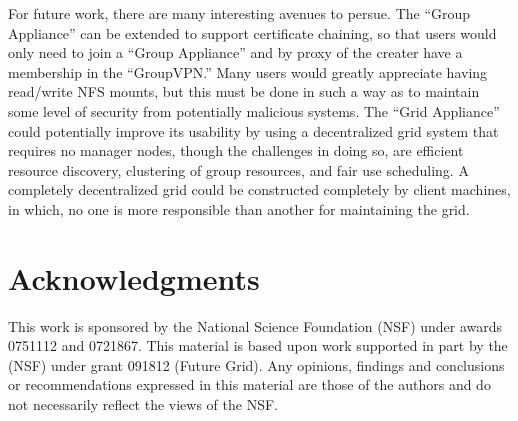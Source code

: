 \documentclass[conference]{IEEEtran}
\begin{document}
For future work, there are many interesting avenues to persue.  The ``Group
Appliance'' can be extended to support certificate chaining, so that users
would only need to join a ``Group Appliance'' and by proxy of the creater have
a membership in the ``GroupVPN.''  Many users would greatly appreciate having
read/write NFS mounts, but this must be done in such a way as to maintain some
level of security from potentially malicious systems.  The ``Grid Appliance''
could potentially improve its usability by using a decentralized grid system
that requires no manager nodes, though the challenges in doing so, are
efficient resource discovery, clustering of group resources, and fair use
scheduling.  A completely decentralized grid could be constructed completely by
client machines, in which, no one is more responsible than another for
maintaining the grid.

\section*{Acknowledgments}

This work is sponsored by the National Science Foundation (NSF) under awards
0751112 and 0721867.  This material is based upon work supported in part by the
(NSF) under grant 091812 (Future Grid).  Any opinions, findings and conclusions
or recommendations expressed in this material are those of the authors and do
not necessarily reflect the views of the NSF.



\end{document}
